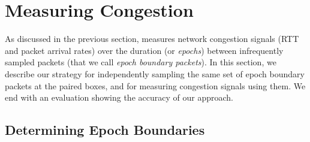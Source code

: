 \section{Measuring Congestion}\label{s:measurement}



As discussed in the previous section, \name measures network congestion signals (RTT and packet arrival rates) over the duration (or \emph{epochs}) between infrequently sampled packets (that we call \emph{epoch boundary packets}). In this section, we describe our strategy for independently sampling the same set of epoch boundary packets at the paired \name boxes, and for measuring congestion signals using them. We end with an evaluation showing the accuracy of our approach.

\subsection{Determining Epoch Boundaries}
\label{s:measure:marking}


